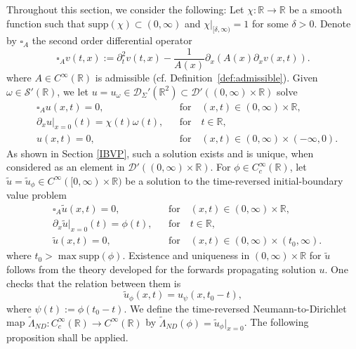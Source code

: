 \documentclass[10pt,a4paper]{article}
\theoremstyle{plain}
\theoremstyle{definition}
\theoremstyle{remark}
\numberwithin{equation}{section}
\newcommand{\R}{\mathbb{R}}
\begin{document}
Throughout this section, we consider the following:
Let $\chi:\R\to\R$ be a smooth function  such that $\text{supp}(\chi) \subset (0,\infty) $ and $\chi |_{[\delta,\infty)}=1$ for some $\delta >0$. Denote by $\square_A $ the second order differential operator 
\begin{equation}
  \label{def-wave-op}
 \square_A v(t,x) :=   \partial_t^2v(t,x)   - \frac{1}{A(x)} \partial_x ( A(x) \partial_x v(x,t)).
\end{equation}
where $A \in C^\infty(\R)$ is admissible (cf. Definition~\ref{def:admissible}). 
Given $\omega\in \mathcal{S}'(\R)$, we let $u=u_\omega \in \mathcal{D}_\Sigma' (\R^2) \subset \mathcal{D}' ((0,\infty) \times \R)$ solve
\begin{align}
 & \square_A u(x,t)  = 0,  && \text{for} \quad (x,t) \in    (0,\infty) \times \R ,\label{eq:wave-u}\\
 & \partial_x u |_{x=0} (t)  = \chi (t) \omega (t), &&\text{for} \quad  t \in \R,\label{eq:neumann-u}\\
 & u (x,t)= 0, &&\text{for} \quad (x,t) \in (0,\infty) \times ( - \infty, 0) .\label{eq:initial-u}
\end{align} 
As shown in Section \ref{IBVP}, such a solution exists and is unique, when considered as an element in $\mathcal{D}' ((0,\infty) \times \R)$. 
For $\phi \in C^\infty_c(\R)$, let $\tilde{u} = \tilde{u}_\phi \in C^\infty ( [0,\infty) \times \R)$ be a solution to the time-reversed initial-boundary value problem
\begin{align}
 & \square_A \tilde{u}(x,t)  = 0,  && \text{for} \quad (x,t) \in    (0,\infty) \times \R ,\label{tr:eq:wave-u}\\
 & \partial_x \tilde{u} |_{x=0} (t)  =  \phi(t), &&\text{for} \quad  t \in \R,\label{tr:eq:neumann-u}\\
 & \tilde{u} (x,t)= 0, &&\text{for} \quad (x,t) \in (0,\infty) \times ( t_0 , \infty ) .\label{tr:eq:initial-u}
\end{align} 
where $t_0 > \max \text{supp}(\phi) $. 
Existence and uniqueness in $(0,\infty) \times \R$ for $\tilde{u}$ follows from the theory developed for the forwards propagating solution $u$. 
One checks that the relation between them is 
\begin{equation}\label{rev-fut}
\tilde{u}_\phi (x,t) = u_{   \psi } (x,t_0-t), 
\end{equation}
where $\psi (t) := \phi(t_0 - t)$. 
We define the time-reversed Neumann-to-Dirichlet map $\tilde\Lambda_{ND} : C^\infty_c (\R) \to  C^\infty( \R)$ by $  \tilde\Lambda_{ND} (\phi) = \tilde{u}_{ \phi }|_{x=0} $.  
The following proposition shall be applied. 
\end{document}
